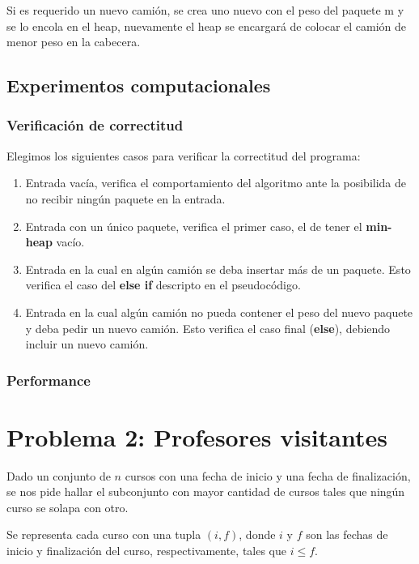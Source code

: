 \documentclass[a4paper,10pt,twoside]{article}
\begin{document}
Si es requerido un nuevo camión, se crea uno nuevo con el peso del paquete m y se lo encola en el heap, nuevamente el heap se encargará de colocar el camión de menor peso en la cabecera.

\subsection{Experimentos computacionales}
\subsubsection{Verificación de correctitud}
Elegimos los siguientes casos para verificar la correctitud del programa:
\begin{enumerate}
	\item Entrada vacía, verifica el comportamiento del algoritmo ante la posibilida de no recibir ningún paquete en la entrada.
	\item Entrada con un único paquete, verifica el primer caso, el de tener el \textbf{min-heap} vacío.
	\item Entrada en la cual en algún camión se deba insertar más de un paquete. Esto verifica el caso del \textbf{else if} descripto en el pseudocódigo.
	\item Entrada en la cual algún camión no pueda contener el peso del nuevo paquete y deba pedir un nuevo camión. Esto verifica el caso final (\textbf{else}), debiendo incluir un nuevo camión.
\end{enumerate}

\subsubsection{Performance}




\section{Problema 2: Profesores visitantes}

Dado un conjunto de $n$ cursos con una fecha de inicio y una fecha de finalización, se nos pide hallar el subconjunto con mayor cantidad de cursos tales que ningún curso se solapa con otro.

Se representa cada curso con una tupla $(i, f)$, donde $i$ y $f$ son las fechas de inicio y finalización del curso, respectivamente, tales que $i \leq f$.
\end{document}
